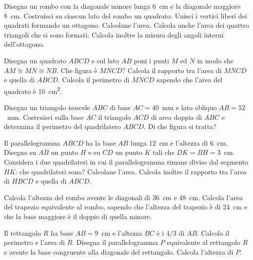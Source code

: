 \begin{multicols}{2}
\begin{esercizio}
\label{ese:7.43}
Disegna un rombo con la diagonale minore lunga 6~cm e la diagonale maggiore 8~cm. Costruisci su ciascun lato del rombo un quadrato. Unisci i vertici liberi dei quadrati formando un ottagono. Calcolane l'area. Calcola anche l'area dei quattro triangoli che si sono formati. Calcola inoltre la misura degli angoli interni dell'ottagono.
\end{esercizio}

\begin{esercizio}
\label{ese:7.44}
Disegna un quadrato $ABCD$ e sul lato $AB$ poni i punti $M$ ed $N$ in modo che $AM\cong MN\cong NB$. Che figura è $MNCD$? Calcola il rapporto tra l'area di $MNCD$ e quella di $ABCD$. Calcola il perimetro di $MNCD$ sapendo che l'area del quadrato è 10~cm\textsuperscript{2}.
\end{esercizio}

\begin{esercizio}
\label{ese:7.45}
Disegna un triangolo isoscele $ABC$ di base $AC=40$~mm e lato obliquo $AB=52$~mm. Costruisci sulla base $AC$ il triangolo $ACD$ di area doppia di $ABC$ e determina il perimetro del quadrilatero $ABCD$. Di che figura si tratta?
\end{esercizio}

\begin{esercizio}
\label{ese:7.46}
Il parallelogramma $ABCD$ ha la base $AB$ lunga 12~cm e l'altezza di 6~cm. Disegna su $AB$ un punto $H$ e su $CD$ un punto $K$ tali che $DK=BH=3$~cm. Considera i due quadrilateri in cui il parallelogramma rimane diviso dal segmento $HK$: che quadrilateri sono? Calcolane l'area. Calcola inoltre il rapporto tra l'area di $HBCD$ e quella di $ABCD$.
\end{esercizio}

\begin{esercizio}
\label{ese:7.47}
Calcola l'altezza del rombo avente le diagonali di 36~cm e 48~cm. Calcola l'area del trapezio equivalente al rombo, sapendo che l'altezza del trapezio è di 24~cm e che la base maggiore è il doppio di quella minore.
\end{esercizio}

\begin{esercizio}
\label{ese:7.48}
Il rettangolo $R$ ha base $AB = 9$~cm e l'altezza $BC$ è i $4/3$ di $AB$. Calcola il perimetro e l'area di $R$. Disegna il parallelogramma $P$ equivalente al rettangolo $R$ e avente la base congruente alla diagonale del rettangolo. Calcola l'altezza di $P$.
\end{esercizio}


\end{multicols}
